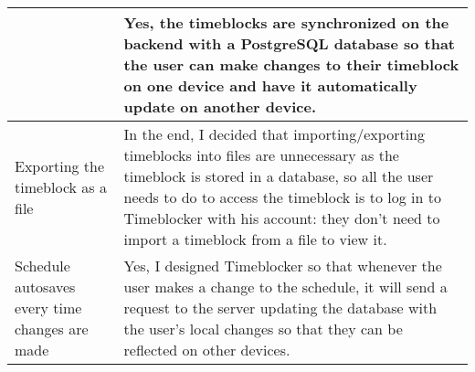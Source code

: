 \documentclass[12pt]{report}
\begin{document}
\begin{xltabular}{\textwidth}{|X|X|}
	&
	Yes, the timeblocks are synchronized on the backend with a PostgreSQL database so that the user can make changes to their timeblock on one device and have it automatically update on another device.
	\\\hline
	Exporting the timeblock as a file
	&
	In the end, I decided that importing/exporting timeblocks into files are unnecessary as the timeblock is stored in a database, so all the user needs to do to access the timeblock is to log in to Timeblocker with his account: they don't need to import a timeblock from a file to view it.
	\\\hline
	Schedule autosaves every time changes are made
	&
	Yes, I designed Timeblocker so that whenever the user makes a change to the schedule, it will send a request to the server updating the database with the user's local changes so that they can be reflected on other devices.
	\\\hline
\end{xltabular}
\end{document}
